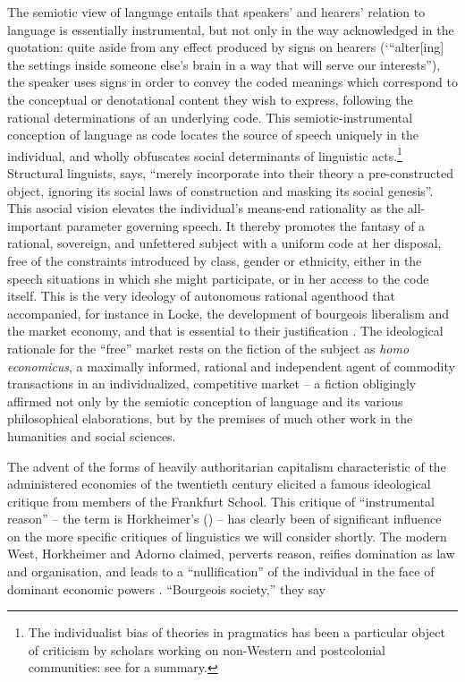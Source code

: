 \documentclass[output=paper]{langscibook}
\begin{document}
The semiotic view of language entails that speakers' and hearers' relation to language is essentially instrumental, but not only in the way acknowledged in the quotation: quite aside from any effect produced by signs on hearers (‘``alter[ing] the settings inside someone else’s brain in a way that will serve our interests''), the speaker uses signs in order to convey the coded meanings which correspond to the conceptual or denotational content they wish to express, following the rational determinations of an underlying code. This semiotic-instrumental conception of language as code locates the source of speech uniquely in the individual, and wholly obfuscates social determinants of linguistic acts.\footnote{The individualist bias of theories in pragmatics has been a particular object of criticism by scholars working on non-Western and postcolonial communities: see \citet{AnchimbeJanney2017} for a summary.} Structural linguists, \citet[44]{Bourdieu1991} says, ``merely incorporate into their theory a pre-constructed object, ignoring its social laws of construction and masking its social genesis''. This asocial vision elevates the individual's means-end rationality as the all-important parameter governing speech. It thereby promotes the fantasy of a rational, sovereign, and unfettered subject with a uniform code at her disposal, free of the constraints introduced by class, gender or ethnicity, either in the speech situations in which she might participate, or in her access to the code itself. This is the very ideology of autonomous rational agenthood that accompanied, for instance in Locke, the development of bourgeois liberalism and the market economy, and that is essential to their justification \citep{Losurdo2014}. The ideological rationale for the ``free'' market rests on the fiction of the subject as \emph{homo economicus}, a maximally informed, rational and independent agent of commodity transactions in an individualized, competitive market – a fiction obligingly affirmed not only by the semiotic conception of language and its various philosophical elaborations, but by the premises of much other work in the humanities and social sciences.

The advent of the forms of heavily authoritarian capitalism characteristic of the administered economies of the twentieth century elicited a famous ideological critique from members of the Frankfurt School. This critique of ``instrumental reason'' – the term is Horkheimer’s (\citeyear{Horkheimer19921947}) – has clearly been of significant influence on the more specific critiques of linguistics we will consider shortly. The modern West, Horkheimer and Adorno claimed, perverts reason, reifies domination as law and organisation, and leads to a ``nullification'' of the individual in the face of dominant economic powers \citep[xvii]{HorkheimerAdorno20021944}. ``Bourgeois society,'' they say
\end{document}
